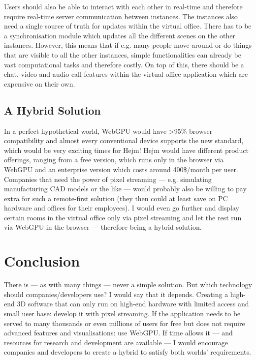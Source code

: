 \documentclass[10pt]{article}
\begin{document}
\begin{sloppypar}
  Users should also be able to interact with each other in real-time and therefore require real-time server communication between instances. The instances also need a single source of truth for updates within the virtual office. There has to be a synchronisation module which updates all the different scenes on the other instances. However, this means that if e.g. many people move around or do things that are visible to all the other instances, simple functionalities can already be vast computational tasks and therefore costly. On top of this, there should be a chat, video and audio call features within the virtual office application which are expensive on their own.

  \subsection{A Hybrid Solution}
  \label{subsec:a-hybrid-solution}

  In a perfect hypothetical world, WebGPU would have >95\% browser compatibility and almost every conventional device supports the new standard, which would be very exciting times for Hejm! Hejm would have different product offerings, ranging from a free version, which runs only in the browser via WebGPU and an enterprise version which costs around 400\$/month per user. Companies that need the power of pixel streaming — e.g. simulating manufacturing CAD models or the like — would probably also be willing to pay extra for such a remote-first solution (they then could at least save on PC hardware and offices for their employees). I would even go further and display certain rooms in the virtual office only via pixel streaming and let the rest run via WebGPU in the browser — therefore being a hybrid solution.

  \section{Conclusion}
  \label{sec:conclusion}

  There is — as with many things — never a simple solution. But which technology should companies/developers use? I would say that it depends. Creating a high-end 3D software that can only run on high-end hardware with limited access and small user base: develop it with pixel streaming. If the application needs to be served to many thousands or even millions of users for free but does not require advanced features and visualisations: use WebGPU. If time allows it — and resources for research and development are available — I would encourage companies and developers to create a hybrid to satisfy both worlds’ requirements.


\end{sloppypar}
\end{document}
